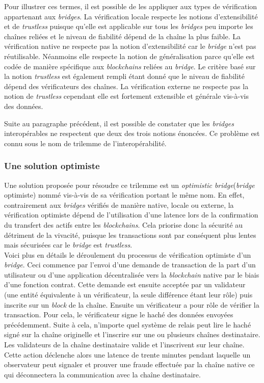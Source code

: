 Pour illustrer ces termes, il est possible de les appliquer aux types de vérification appartenant aux \textit{bridges}. La vérification locale respecte les notions d’extensibilité et de \textit{trustless} puisque qu'elle est applicable sur tous les \textit{bridges} peu importe les chaînes reliées et le niveau de fiabilité dépend de la chaîne la plus faible.
La vérification native ne respecte pas la notion d’extensibilité car le \textit{bridge} n’est pas réutilisable. Néanmoins elle respecte la notion de généralisation parce qu’elle est codée de manière spécifique aux \textit{\gls{blockchain}s} reliées au \textit{bridge}. Le critère basé sur la notion \textit{trustless} est également rempli étant donné que le niveau de fiabilité dépend des \gls{vérificateur}s des chaînes.
La vérification externe ne respecte pas la notion de \textit{trustless} cependant elle est fortement extensible et générale vis-à-vis des données. \cite{Ngrave}

 Suite au paragraphe précédent, il est possible de constater que les \textit{bridges} interopérables ne respectent que deux des trois notions énoncées. Ce problème est connu sous le nom de trilemme de l’interopérabilité. 

\subsubsection{Une solution optimiste}

Une solution proposée pour résoudre ce trilemme est un \textit{optimistic bridge}(\textit{bridge} optimiste) nommé vis-à-vis de sa vérification portant le même nom\cite{OptimisticBhuptani}. En effet, contrairement aux \textit{bridges} vérifiés de manière native, locale ou externe, la vérification optimiste dépend de l’utilisation d’une latence lors de la confirmation du transfert des \gls{actif}s entre les \textit{\gls{blockchain}s}. Cela priorise donc la sécurité au détriment de la vivacité, puisque les transactions sont par conséquent plus lentes mais sécurisées car le \textit{bridge} est \textit{trustless}. \\

Voici plus en détails le déroulement du processus de vérification optimiste d’un \textit{bridge}.
Ceci commence par l’envoi d'une demande de transaction de la part d’un utilisateur ou d’une application décentralisée vers la \textit{\gls{blockchain}} native par le biais d’une fonction contrat. Cette demande est ensuite acceptée par un validateur (une entité équivalente à un \gls{vérificateur}, la seule différence étant leur rôle) puis inscrite sur un \textit{block} de la chaîne.\cite{NomadDocsVerification}
Ensuite un \gls{vérificateur} a pour rôle de vérifier la transaction. Pour cela, le \gls{vérificateur} signe le haché des données envoyées précédemment. 
Suite à cela, n’importe quel système de relais peut lire le haché signé sur la chaîne originelle et l’inscrire sur une ou plusieurs chaînes destinataire. Les validateurs de la chaîne destinataire valide et l'inscrivent sur leur chaîne. Cette action déclenche alors une latence de trente minutes pendant laquelle un observateur peut signaler et prouver une fraude effectuée par la chaîne native ce qui déconnectera la communication avec la chaîne destinataire. 

